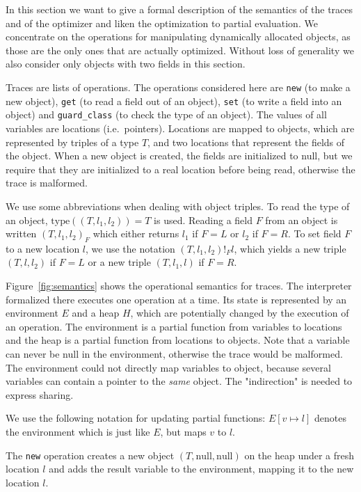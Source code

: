 \documentclass[preprint]{sigplanconf}
\begin{document}
In this section we want to give a formal description of the semantics of the
traces and of the optimizer and liken the optimization to partial evaluation.
We concentrate on the operations for manipulating dynamically allocated objects,
as those are the only ones that are actually optimized. Without loss of
generality we also consider only objects with two fields in this section.

Traces are lists of operations. The operations considered here are \lstinline{new} (to make
a new object), \lstinline{get} (to read a field out of an object), \lstinline{set} (to write a field
into an object) and \lstinline{guard_class} (to check the type of an object). The values of all
variables are locations (i.e.~pointers). Locations are mapped to objects, which
are represented by triples of a type $T$, and two locations that represent the
fields of the object. When a new object is created, the fields are initialized
to null, but we require that they are initialized to a real
location before being read, otherwise the trace is malformed.

We use some abbreviations when dealing with object triples. To read the type of
an object, $\mathrm{type}((T,l_1,l_2))=T$ is used. Reading a field $F$ from an
object is written $(T,l_1,l_2)_F$ which either returns $l_1$ if $F=L$ or $l_2$
if $F=R$. To set field $F$ to a new location $l$, we use the notation
$(T,l_1,l_2)!_Fl$, which yields a new triple $(T,l,l_2)$ if $F=L$ or a new
triple $(T,l_1,l)$ if $F=R$.

Figure~\ref{fig:semantics} shows the operational semantics for traces. The
interpreter formalized there executes one operation at a time. Its state is
represented by an environment $E$ and a heap $H$, which are potentially changed by the
execution of an operation. The environment is a partial function from variables
to locations and the heap is a partial function from locations to objects. Note
that a variable can never be null in the environment, otherwise the trace would
be malformed. The environment could not directly map variables to object,
because several variables can contain a pointer to the \emph{same} object. 
The "indirection" is needed to express sharing.

We use the following notation for updating partial functions:
$E[v\mapsto l]$ denotes the environment which is just like $E$, but maps $v$ to
$l$.

The \lstinline{new} operation creates a new object $(T,\mathrm{null},\mathrm{null})$ on the
heap under a fresh location $l$ and adds the result variable to the environment,
mapping it to the new location $l$.
\end{document}
